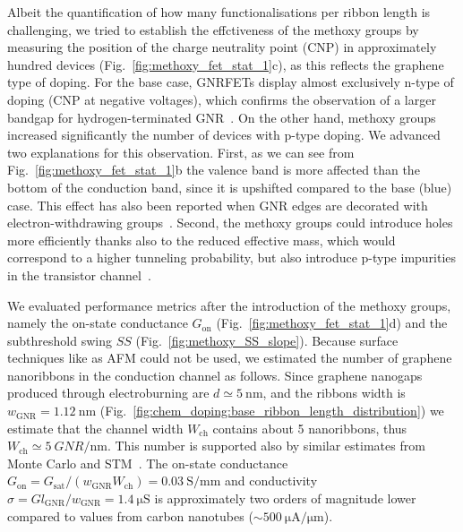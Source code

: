 Albeit the quantification of how many functionalisations per ribbon length is challenging, we tried to establish the effctiveness of the methoxy groups by measuring the position of the charge neutrality point (CNP) in approximately hundred devices (Fig.~\ref{fig:methoxy_fet_stat_1}c), as this reflects the graphene type of doping. For the base case, \glspl{GNRFET} display almost exclusively n-type of doping (CNP at negative voltages), which confirms the observation of a larger bandgap for hydrogen-terminated \gls{GNR}~\cite{liu2011chemical}. On the other hand, methoxy groups increased significantly the number of devices with p-type doping. We advanced two explanations for this observation. First, as we can see from Fig.~\ref{fig:methoxy_fet_stat_1}b the valence band is more affected than the bottom of the conduction band, since it is upshifted compared to the base (blue) case. This effect has also been reported when \gls{GNR} edges are decorated with electron-withdrawing groups~\cite{carbonell2017doping, ohtomo2018interpolymer}. Second, the methoxy groups could introduce holes more efficiently thanks also to the reduced effective mass, which would correspond to a higher tunneling probability, but also introduce p-type impurities in the transistor channel~\cite{schedin2007detection, jung2009charge}.

We evaluated performance metrics after the introduction of the methoxy groups, namely the on-state conductance $G_\textrm{on}$ (Fig.~\ref{fig:methoxy_fet_stat_1}d) and the subthreshold swing $SS$ (Fig.~\ref{fig:methoxy_SS_slope}).
Because surface techniques like as \gls{AFM} could not be used, we estimated the number of graphene nanoribbons in the conduction channel as follows. Since graphene nanogaps produced through electroburning are $d\simeq\SI{5}{\nano\metre}$, and the ribbons width is $w_\textrm{GNR}=\SI{1.12}{\nano\metre}$ (Fig.~\ref{fig:chem_doping:base_ribbon_length_distribution}) we estimate that the channel width $W_\textrm{ch}$ contains about 5 nanoribbons, thus $W_\textrm{ch}\simeq\SI{5}{\unit{GNR\per\nano\metre}}$. This number is supported also by similar estimates from Monte Carlo and STM~\cite{llinas2017short,lin2022scaling, de2016substrate}. The on-state conductance $G_\textrm{on} = G_\textrm{sat}/(w_\textrm{GNR}W_\textrm{ch})=\SI{0.03}{\siemens\per\milli\metre}$ and conductivity $\sigma=Gl_\textrm{GNR}/w_\textrm{GNR}=\SI{1.4}{\micro\siemens}$ is approximately two orders of magnitude lower compared to values from carbon nanotubes ($\sim\SI{500}{\micro\ampere\per\micro\metre}$).

